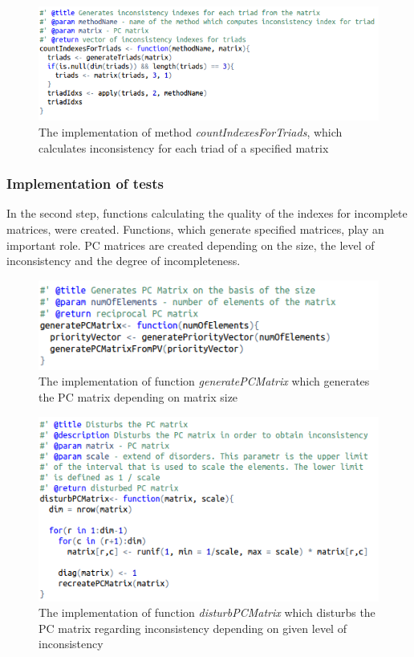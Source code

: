 \begin{figure}[h]
\centerline{\includegraphics[scale=0.75]{images/kod5.png}}
\caption{The implementation of method \textit{countIndexesForTriads}, which calculates inconsistency for each triad of a specified matrix}
\label{fig:rstudio}
\end{figure}


\subsubsection{Implementation of tests}
In the second step, functions calculating the quality of the indexes for incomplete matrices, were created. Functions, which generate specified matrices, play an important role. PC matrices are created depending on the size, the level of inconsistency and the degree of incompleteness.

\begin{figure}[h]
\centerline{\includegraphics[scale=0.75]{images/kod11.png}}
\caption{The implementation of function \textit{generatePCMatrix} which generates the PC matrix depending on matrix size}
\label{fig:rstudio}
\end{figure}

\begin{figure}[h]
\centerline{\includegraphics[scale=0.75]{images/kod12.png}}
\caption{The implementation of function \textit{disturbPCMatrix} which disturbs the PC matrix regarding inconsistency depending on given level of inconsistency}
\label{fig:rstudio}
\end{figure}

